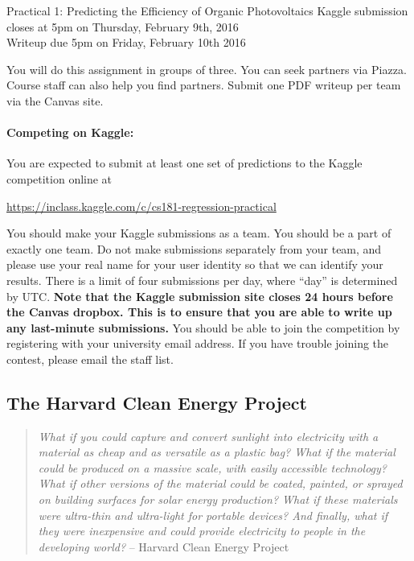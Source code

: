 \documentclass[12pt]{article}
\begin{document}
	\begin{center}
		{\Large Practical 1: Predicting the Efficiency of Organic Photovoltaics}
		Kaggle submission closes at 5pm on Thursday, February 9th, 2016\\
		Writeup due 5pm on Friday,  February 10th 2016 
	\end{center}
	
	\noindent You will do this assignment in groups of three. You can seek partners via Piazza.  Course staff can also help you find partners.  Submit one PDF writeup per team via the Canvas site.
	
	\paragraph{Competing on Kaggle:} You are expected to submit at least one set of predictions to the Kaggle competition online at
	\begin{center}
		\url{https://inclass.kaggle.com/c/cs181-regression-practical}
	\end{center}
	You should make your Kaggle submissions as a team.  You should be a part of exactly one team. Do not make submissions separately from your team, and please use your real name for your user identity so that we can identify your results.  There is a limit of four submissions per day, where ``day'' is determined by UTC.  \textbf{Note that the Kaggle submission site closes 24 hours before the Canvas dropbox.  This is to ensure that you are able to write up any last-minute submissions.}  You should be able to join the competition by registering with your university email address.  If you have trouble joining the contest, please email the staff list.
	
	\subsection*{The Harvard Clean Energy Project}
	
	\begin{quote}
		\emph{What if you could capture and convert sunlight into electricity with a material as cheap and as versatile as a plastic bag? What if the material could be produced on a massive scale, with easily accessible technology? What if other versions of the material could be coated, painted, or sprayed on building surfaces for solar energy production? What if these materials were ultra-thin and ultra-light for portable devices? And finally, what if they were inexpensive and could provide electricity to people in the developing world?} -- Harvard Clean Energy Project
	\end{quote}
	
\end{document}
